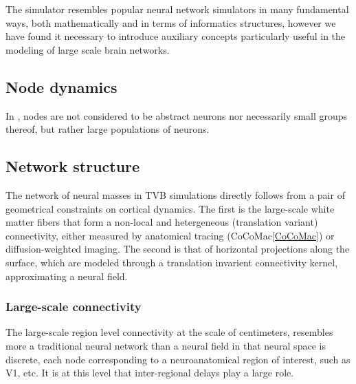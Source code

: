 The \TVB simulator resembles popular neural network simulators in 
many fundamental ways, both mathematically and in terms of informatics 
structures, however we have found it necessary to introduce auxiliary
concepts particularly useful in the modeling of large scale brain 
networks.


\subsection{Node dynamics}

	In \TVB, nodes are not considered to be abstract neurons nor necessarily 
	small groups thereof, but rather large populations of neurons. 




\subsection{Network structure}

	The network of neural masses in TVB simulations directly follows from 
	a pair of 
	geometrical constraints on cortical dynamics. The first is the 
	large-scale white matter fibers that form a non-local and hetergeneous
	(translation variant) connectivity, either measured by anatomical
	tracing (CoCoMac\ref{CoCoMac}) or diffusion-weighted imaging. The second
	is that of horizontal projections along the surface, which are modeled
	through a translation invarient connectivity kernel, approximating a 
	neural field. 

	\subsubsection{Large-scale connectivity}

	The large-scale region level connectivity at the scale of centimeters,
	resembles more a traditional
	neural network than a neural field in that neural space is discrete, 
	each node corresponding to a neuroanatomical region of interest, such
	as V1, etc. It is at this level that inter-regional delays play a large
	role. 

